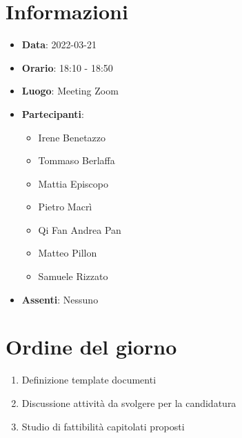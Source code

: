     \section{Informazioni}
    \begin{itemize}
        \item \textbf{Data}: 2022-03-21        %
        \item \textbf{Orario}: 18:10 - 18:50   %
        \item \textbf{Luogo}: Meeting Zoom
        \item \textbf{Partecipanti}:
        \begin{itemize}
            \item Irene Benetazzo
            \item Tommaso Berlaffa
            \item Mattia Episcopo
            \item Pietro Macrì
            \item Qi Fan Andrea Pan
            \item Matteo Pillon
            \item Samuele Rizzato
        \end{itemize}
        \item \textbf{Assenti}:
        Nessuno
    \end{itemize}
    \section{Ordine del giorno}
    \begin{enumerate}
        \item Definizione template documenti
        \item Discussione attività da svolgere per la candidatura
        \item Studio di fattibilità capitolati proposti
    \end{enumerate}
    \newpage